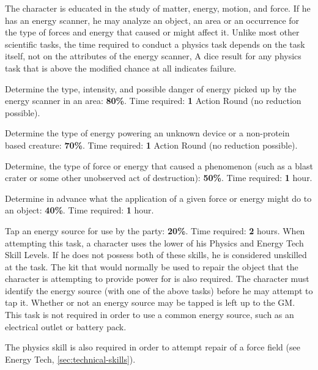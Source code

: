 \label{sec:skill-physics}

The character is educated in the study of matter, energy, motion, and
force.  If he has an energy scanner, he may analyze an object, an area
or an occurrence for the type of forces and energy that caused or
might affect it.  Unlike most other scientific tasks, the time required
to conduct a physics task depends on the task itself, not on the
attributes of the energy scanner, A dice result for any physics task
that is above the modified chance at all indicates failure.

\begin{tasklist}
\item Determine the type, intensity, and possible danger of energy
  picked up by the energy scanner in an area: \textbf{80\%}.  Time
  required: \textbf{1} Action Round (no reduction possible).
\item Determine the type of energy powering an unknown device or a
  non-protein based creature: \textbf{70\%}.  Time required:
  \textbf{1} Action Round (no reduction possible).
\item Determine, the type of force or energy that caused a phenomenon
  (such as a blast crater or some other unobserved act of
  destruction): \textbf{50\%}.  Time required: \textbf{1} hour.
\item Determine in advance what the application of a given force or
  energy might do to an object: \textbf{40\%}.  Time required:
  \textbf{1} hour.
\item Tap an energy source for use by the party: \textbf{20\%}.  Time
  required: \textbf{2} hours.  When attempting this task, a character
  uses the lower of his Physics and Energy Tech Skill Levels.  If he
  does not possess both of these skills, he is considered unskilled at
  the task.  The kit that would normally be used to repair the object
  that the character is attempting to provide power for is also
  required.  The character must identify the energy source (with one
  of the above tasks) before he may attempt to tap it.  Whether or not
  an energy source may be tapped is left up to the GM.  This task is
  not required in order to use a common energy source, such as an
  electrical outlet or battery pack.
\end{tasklist}

The physics skill is also required in order to attempt repair of a
force field (see Energy Tech, \ref{sec:technical-skills}).

\label{sec:skill-planetology}

